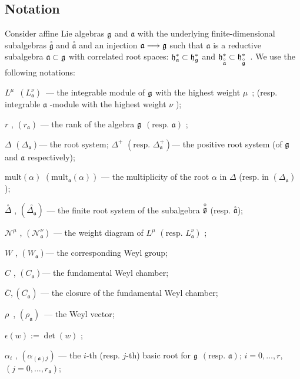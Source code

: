 \documentclass[12pt]{iopart}
\theoremstyle{definition}
\newcommand{\go}{\stackrel{\circ }{\mathfrak{g}}}
\newcommand{\ao}{\stackrel{\circ }{\mathfrak{a}}}
\newcommand{\co}[1]{\stackrel{\circ }{#1}}
\newcommand{\af}{\mathfrak{a}}
\begin{document}
\subsection{Notation}
\label{sec:notation}

Consider affine Lie algebras $\frak{g}$ and $\af$ with the
underlying finite-dimensional subalgebras $\go$ and $%
\ao$ and an injection $\af\longrightarrow \frak{g%
}$ such that $\af$ is a reductive subalgebra $\frak{a\subset g}$ with
correlated root spaces: $\frak{h}_{\af}^{\ast }\subset \frak{h}_{\frak{g%
}}^{\ast }$ and $\frak{h}_{\ao}^{\ast }\subset \frak{h%
}_{\go}^{\ast }$\
.
We use the following notations:

$L^{\mu }$\ $\left( L_{\af}^{\nu }\right) $\ --- the integrable module
of $\frak{g}$ with the highest weight $\mu $\ ; (resp. integrable $\af$
-module with the highest weight $\nu $ );

$r$ , $\left( r_{\af}\right) $ --- the rank of the algebra $\frak{g}$ $%
\left( \mbox{resp. }\af\right) $ ;

$\Delta $ $\left( \Delta _{\af}\right) $--- the root system; $\Delta
^{+} $ $\left( \mbox{resp. }\Delta _{\af}^{+}\right) $--- the positive
root system (of $\frak{g}$ and $\af$ respectively);

$\mathrm{mult}\left( \alpha \right) $ $\left( \mathrm{mult}_{\af}\left(
\alpha \right) \right) $ --- the multiplicity of the root $\alpha$ in $\Delta
$ (resp. in $\left( \Delta _{\af}\right) $);

$\co{\Delta}$ , $\left( \co{\Delta _{\af}}%
\right)$ --- the finite root system of the subalgebra $\co{%
\frak{g}}$ (resp. $\co{\af}$);

$\mathcal{N}^{\mu }$ , $\left( \mathcal{N}_{\af}^{\nu }\right) $ --- the
weight diagram of $L^{\mu }$ $\left( \mbox{resp. }L_{\af}^{\nu }\right)
$ ;

$W$ , $\left( W_{\af}\right) $--- the corresponding Weyl group;

$C$ , $\left( C_{\af}\right) $--- the fundamental Weyl chamber;

$\bar{C}, \left(\bar{C_{\mathfrak{a}}}\right)$ --- the closure of the fundamental Weyl chamber;

$\rho $\ , $\left( \rho _{\af}\right) $\ --- the Weyl vector;

$\epsilon \left( w\right) :=\det \left( w\right) $ ;

$\alpha _{i}$ , $\left( \alpha _{\left( \af\right) j}\right) $ --- the $i
$-th (resp. $j$-th) basic root for $\frak{g}$ $\left( \mbox{resp. }\af%
\right) $; $i=0,\ldots ,r$,\ \ $\left( j=0,\ldots ,r_{\af}\right) $;
\end{document}
